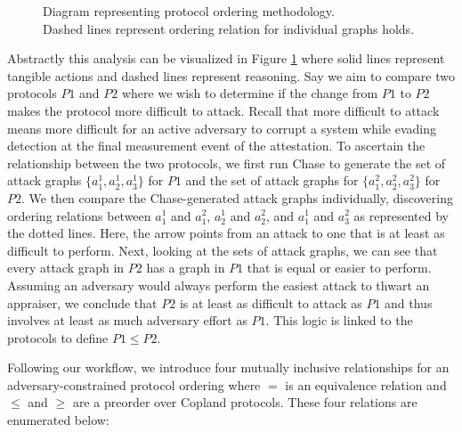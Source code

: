 \documentclass[runningheads]{llncs}
\theoremstyle{definition}
\newcommand{\squash}{\itemsep=0pt\parskip=0pt}
\begin{document}
\begin{figure}[hbtp]
    \centering
    \captionsetup{justification=centering,margin=1cm}
    
    \caption[Protocol ordering abstraction]{Diagram representing protocol ordering methodology. \\ Dashed lines represent ordering relation for individual graphs holds. }
    \label{fig:protocol-org-fig}
\end{figure}

Abstractly this analysis can be visualized in Figure \ref{fig:protocol-org-fig} where solid lines represent tangible actions and dashed lines represent reasoning. Say we aim to compare two protocols $P1$ and $P2$ where we wish to determine if the change from $P1$ to $P2$ makes the protocol more difficult to attack. Recall that more difficult to attack means more difficult for an active adversary to corrupt a system while evading detection at the final measurement event of the attestation. To ascertain the relationship between the two protocols, we first run Chase to generate the set of attack graphs $\{ a^1_1, a^1_2, a^1_3\}$ for $P1$ and the set of attack graphs for $\{a^2_1, a^2_2, a^2_3\}$ for $P2$. We then compare the Chase-generated attack graphs individually, discovering ordering relations between $a^1_1$ and $a^2_1$, $a^1_2$ and $a^2_2$, and $a^1_1$ and $a^2_3$ as represented by the dotted lines. Here, the arrow points from an attack to one that is at least as difficult to perform. Next, looking at the sets of attack graphs, we can see that every attack graph in $P2$ has a graph in $P1$ that is equal or easier to perform. Assuming an adversary would always perform the easiest attack to thwart an appraiser, we conclude that $P2$ is at least as difficult to attack as $P1$ and thus involves at least as much adversary effort as $P1$. This logic is linked to the protocols to define $ P1 \leq P2$.  

Following our workflow, we introduce four mutually inclusive relationships for an adversary-constrained protocol ordering where $=$ is an equivalence relation and $\le$ and $\ge$ are a preorder over Copland protocols. These four relations are enumerated below:

\vspace*{-10mm}
\end{document}
